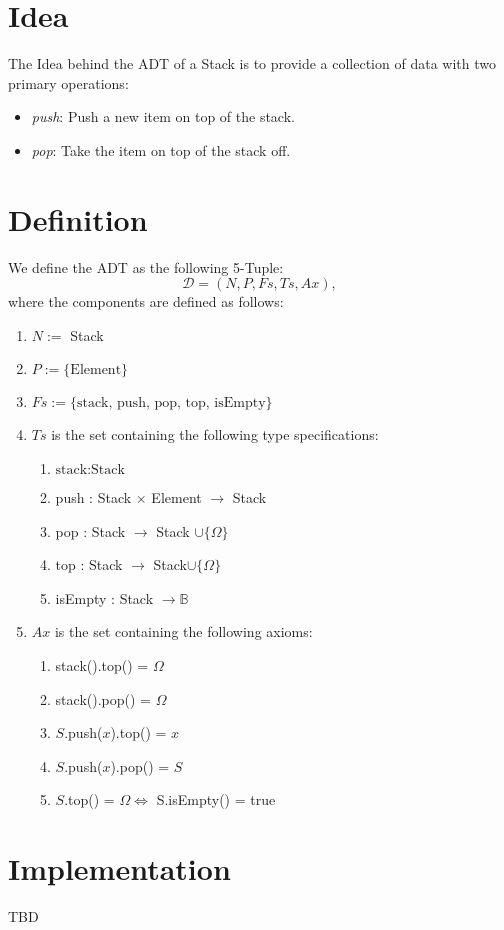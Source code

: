 \documentclass{article}
\begin{document}
\section*{Idea}
The Idea behind the ADT of a Stack is to provide a collection of data with two primary operations:

\begin{itemize}
	\item \emph{push}: Push a new item on top of the stack.
	\item \emph{pop}: Take the item on top of the stack off.
\end{itemize}


\section*{Definition}

We define the ADT as the following 5-Tuple:
\[\mathcal{D} = (N, P, Fs, Ts, Ax),\]
where the components are defined as follows:

\begin{enumerate}
 \item \(N :=\) Stack
 \item \(P := \{ \text{Element} \}\)
 \item \(Fs := \{ \text{stack, push, pop, top, isEmpty} \}\)
 \item \(Ts\) is the set containing the following type specifications:
	\begin{enumerate}
		\item \( \text{stack} : \text{Stack} \)
		\item push : Stack \(\times\) Element \(\rightarrow\) Stack
		\item pop : Stack \(\rightarrow\) Stack \(\cup \{\Omega\}\)
		\item top : Stack \(\rightarrow\) Stack\(\cup \{\Omega\}\)
		\item isEmpty : Stack \(\rightarrow \mathbb{B}\)
	\end{enumerate}
 \item \(Ax\) is the set containing the following axioms:
	\begin{enumerate}
		\item stack().top() = \(\Omega\)
  \item stack().pop() = \(\Omega\)
  \item \(S\).push(\(x\)).top() = \(x\)
  \item \(S\).push(\(x\)).pop() = \(S\)
  \item \(S\).top() = \(\Omega \iff\) S.isEmpty() = true
	\end{enumerate}
\end{enumerate}


\section*{Implementation}
TBD
\end{document}
